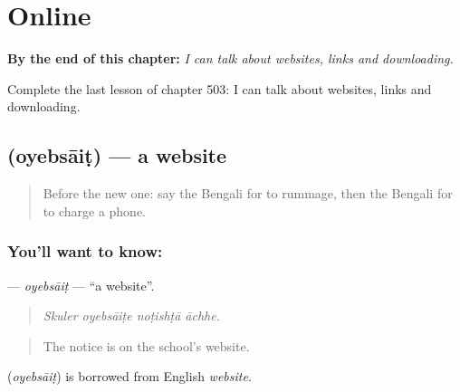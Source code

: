 
\chapter{Online}
\label{ch:bn-online}

\begin{chapteropening}
\textbf{By the end of this chapter:} \emph{I can talk about websites, links and downloading.}

Complete the last lesson of chapter 503: I can talk about websites, links and downloading.
\end{chapteropening}

\section[\texorpdfstring{\bn{ওয়েবসাইট} (oyebsāiṭ)}{ওয়েবসাইট (oyebsāiṭ)}]{ (oyebsāiṭ) — a website}

\label{lesson:BN-C503-oyebsait}



\begin{quote}
Before the new one: say the Bengali for to rummage, then the Bengali for to charge a phone.
\end{quote}

\subsection*{You'll want to know: }
\textbf{} — \emph{oyebsāiṭ} — \textquotedblleft{}a website\textquotedblright{}.

\begin{quote}
   
\end{quote}

\begin{quote}
\emph{Skuler oyebsāiṭe noṭishṭā āchhe.}
\end{quote}

\begin{quote}
The notice is on the school's website.
\end{quote}

\begin{cousinweb}
\textbf{} (\emph{oyebsāiṭ}) is borrowed from English \emph{website}.
\end{cousinweb}

